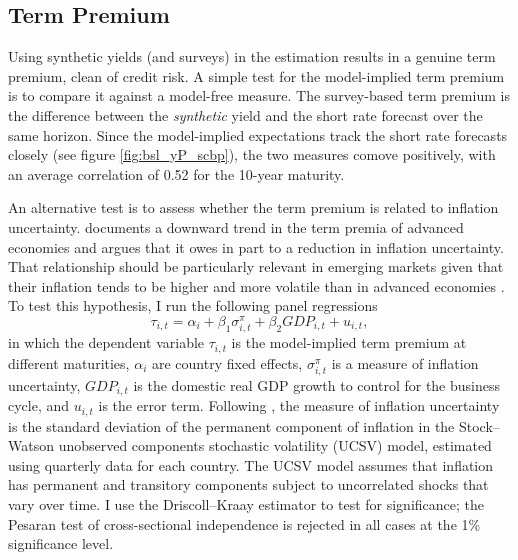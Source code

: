 \documentclass[a4paper, 12pt]{article}
\providecommand{\idxt}{t}
\providecommand{\idxi}{i}
\providecommand{\idxspnl}{\idxi,\idxt}
\newcommand{\eqpanelUCSV}{\tau_{\idxspnl} = \alpha_{\idxi} + \beta_{1} \sigma^{\pi}_{\idxspnl} + \beta_{2} GDP_{\idxspnl} + u_{\idxspnl}}
\begin{document}
\begin{appendices}
	\subsection{Term Premium} \label{sec:TP}
	Using synthetic yields (and surveys) in the estimation results in a genuine term premium, clean of credit risk. A simple test for the model-implied term premium is to compare it against a model-free measure. The survey-based term premium is the difference between the \textit{synthetic} yield and the short rate forecast over the same horizon. Since the model-implied expectations track the short rate forecasts closely (see figure \ref{fig:bsl_yP_scbp}), the two measures comove positively, with an average correlation of 0.52 for the 10-year maturity. %
	
	An alternative test is to assess whether the term premium is related to inflation uncertainty. \cite{Wright:2011} documents a downward trend in the term premia of advanced economies and argues that it owes in part to a reduction in inflation uncertainty. That relationship should be particularly relevant in emerging markets given that their inflation tends to be higher and more volatile than in advanced economies \citep{HaKoseOhnsorge:2019}. To test this hypothesis, I run the following panel regressions 
	\begin{equation*}
	\eqpanelUCSV ,
	\end{equation*}
	\noindent in which the dependent variable \(\tau_{\idxspnl}\) is the model-implied term premium at different maturities, \(\alpha_{\idxi}\) are country fixed effects, \(\sigma^{\pi}_{\idxspnl}\) is a measure of inflation uncertainty, \(GDP_{\idxspnl}\) is the domestic real GDP growth to control for the business cycle, and \(u_{\idxspnl}\) is the error term. Following \cite{Wright:2011}, the measure of inflation uncertainty is the standard deviation of the permanent component of inflation in the Stock--Watson unobserved components stochastic volatility (UCSV) model, estimated using quarterly data for each country. The UCSV model assumes that inflation has permanent and transitory components subject to uncorrelated shocks that vary over time. I use the Driscoll--Kraay estimator to test for significance; the Pesaran test of cross-sectional independence is rejected in all cases at the 1\% significance level. 
	

\end{appendices}
\end{document}
